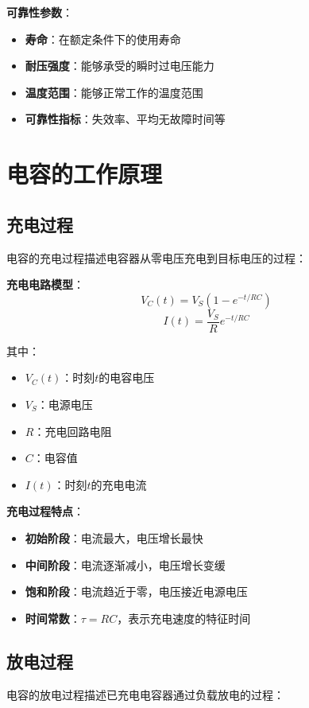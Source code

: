 \documentclass[12pt,UTF8]{ctexbook}
\begin{document}
\textbf{可靠性参数}：
\begin{itemize}[leftmargin=3.5em]
    \item \textbf{寿命}：在额定条件下的使用寿命
    \item \textbf{耐压强度}：能够承受的瞬时过电压能力
    \item \textbf{温度范围}：能够正常工作的温度范围
    \item \textbf{可靠性指标}：失效率、平均无故障时间等
\end{itemize}

\section{电容的工作原理}

\subsection{充电过程}

电容的充电过程描述电容器从零电压充电到目标电压的过程：

\textbf{充电电路模型}：
\[ V_C(t) = V_S(1 - e^{-t/RC}) \]
\[ I(t) = \frac{V_S}{R}e^{-t/RC} \]

其中：
\begin{itemize}[leftmargin=3.5em]
    \item $V_C(t)$：时刻$t$的电容电压
    \item $V_S$：电源电压
    \item $R$：充电回路电阻
    \item $C$：电容值
    \item $I(t)$：时刻$t$的充电电流
\end{itemize}

\textbf{充电过程特点}：
\begin{itemize}[leftmargin=3.5em]
    \item \textbf{初始阶段}：电流最大，电压增长最快
    \item \textbf{中间阶段}：电流逐渐减小，电压增长变缓
    \item \textbf{饱和阶段}：电流趋近于零，电压接近电源电压
    \item \textbf{时间常数}：$\tau = RC$，表示充电速度的特征时间
\end{itemize}

\subsection{放电过程}

电容的放电过程描述已充电电容器通过负载放电的过程：
\end{document}
